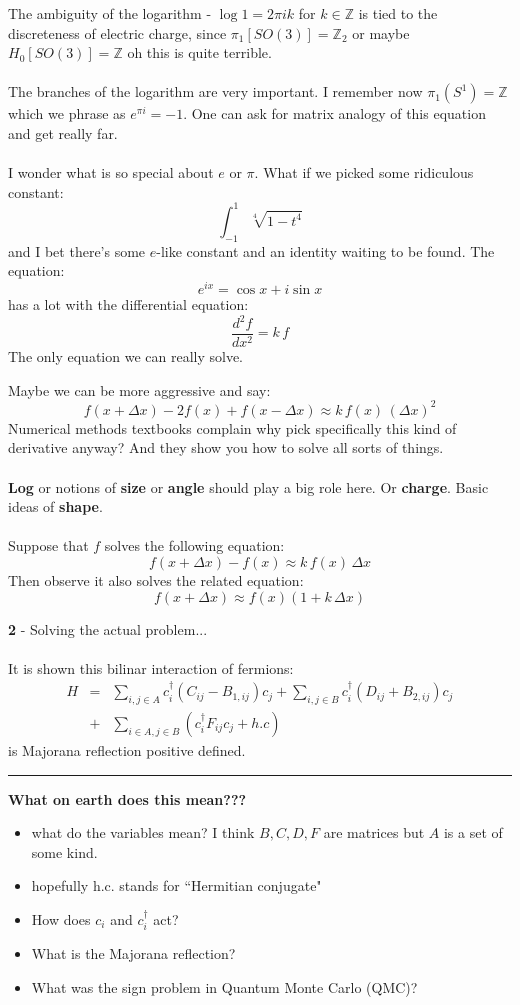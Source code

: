 \documentclass[12pt]{article}
\begin{document}
\noindent The ambiguity of the logarithm - $\log 1 = 2\pi i k$ for $k \in \mathbb{Z}$ is tied to the discreteness of electric charge, since $\pi_1[SO(3)] = \mathbb{Z}_2$ or maybe $ H_0[SO(3)] = \mathbb{Z} $ oh this is quite terrible. \\ \\
The branches of the logarithm are very important.  I remember now $\pi_1(S^1) = \mathbb{Z}$ which we phrase as $e^{\pi i } = -1 $.  One can ask for matrix analogy of this equation and get really far. \\ \\
I wonder what is so special about $e$ or $\pi$.  What if we picked some ridiculous constant:
$$ \int_{-1}^1 \sqrt[4]{1 - t^4} $$
and I bet there's some $e$-like constant and an identity waiting to be found.  The equation:
$$ e^{ix} = \cos x + i \sin x $$
has a lot with the differential equation:
$$ \frac{d^2 f}{dx^2} = k\, f$$
The only equation we can really solve.  \newpage 

\noindent Maybe we can be more aggressive and say:
$$ f(x + \Delta x) - 2 f(x) + f(x - \Delta x) \approx k \, f(x) \, (\Delta x)^2 $$
Numerical methods textbooks complain why pick specifically this kind of derivative anyway?  And they show you how to solve all sorts of things. \\ \\
\textbf{Log} or notions of \textbf{size} or \textbf{angle} should play a big role here.  Or \textbf{charge}.  Basic ideas of \textbf{shape}.  \\ \\
Suppose that $f$ solves the following equation:
$$ f(x + \Delta x) - f(x) \approx k \, f(x) \, \Delta x $$
Then observe it also solves the related equation:
$$ f(x + \Delta x) \approx f(x) (1 + k  \, \Delta x) $$
 \newpage

\noindent \textbf{2} - Solving the actual problem... \\ \\
It is shown this bilinar interaction of fermions:
\begin{eqnarray*}
H &=& \sum_{i,j \in A} c_i^\dagger(C_{ij} - B_{1,ij})c_j 
+ \sum_{i,j \in B} c_i^\dagger(D_{ij} + B_{2,ij})c_j \\ 
&+& \sum_{i \in A, j \in B} \left( c_i^\dagger F_{ij} c_j + h.c \right) \end{eqnarray*}
is Majorana reflection positive defined.
\vspace{12pt}
\hrule
\vspace{12pt}
\noindent \textbf{What on earth does this mean???}
\begin{itemize}
\item what do the variables mean?  I think $B,C,D,F$ are matrices but $A$ is a set of some kind.
\item hopefully h.c. stands for ``Hermitian conjugate"
\item How does $c_i$ and $c_i^\dagger$ act? 
\item What is the Majorana reflection?
\item What was the sign problem in Quantum Monte Carlo (QMC)?
\end{itemize}
\end{document}
